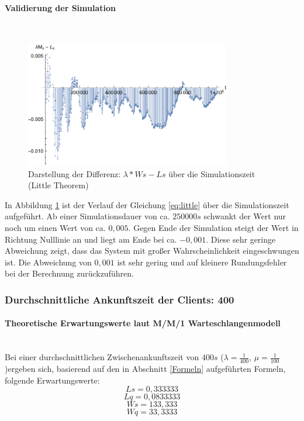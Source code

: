 \paragraph{Validierung der Simulation}
\\
\begin{figure}[htpb]
	\centering
	\includegraphics[width=0.8\textwidth]{abbildungen/1_Phone_VIP/Arrival_1000_Serve_100_dur_1000000_Skip_0/LittleSystem.pdf}
	\caption{Darstellung der Differenz: $\lambda * Ws - Ls$ über die Simulationszeit (Little Theorem)}
	\label{fig:LittleSystemVIP1000}
\end{figure}

In Abbildung \ref{fig:LittleSystemVIP1000} ist der Verlauf der Gleichung \ref{eq:little} über die Simulationszeit aufgeführt. Ab einer Simulationsdauer von ca. $250000s$ schwankt der Wert nur noch um einen Wert von ca. $0,005$. Gegen Ende der Simulation steigt der Wert in Richtung Nulllinie an und liegt am Ende bei ca. $-0,001$. Diese sehr geringe Abweichung zeigt, dass das System mit großer Wahrscheinlichkeit eingeschwungen ist. Die Abweichung von $0,001$ ist sehr gering und auf kleinere Rundungsfehler bei der Berechnung zurückzuführen.




\subsubsection{Durchschnittliche Ankunftszeit der Clients: 400}
\paragraph{Theoretische Erwartungswerte laut M/M/1 Warteschlangenmodell}
\\
Bei einer durchschnittlichen Zwischenankunftszeit von $400s$ ($\lambda=\frac{1}{400}$, $\mu=\frac{1}{100}$)ergeben sich, basierend auf den in Abschnitt \ref{Formeln} aufgeführten Formeln, folgende Erwartungswerte:
\begin{equation}
Ls=0,333333
\end{equation}
\begin{equation}
Lq=0,0833333
\end{equation}
\begin{equation}
Ws=133,333
\end{equation}
\begin{equation}
Wq=33,3333
\end{equation}


